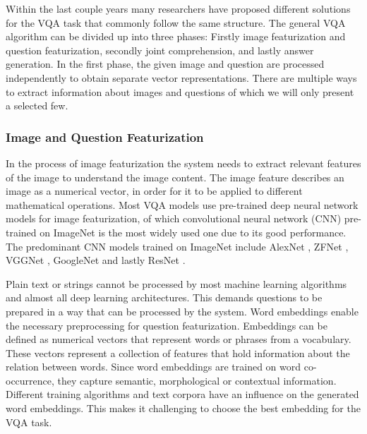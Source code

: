\documentclass{article}
\begin{document}
Within the last couple years many researchers have proposed different solutions for the VQA task that commonly follow the same structure. The general VQA algorithm can be divided up into three phases: Firstly image featurization and question featurization, secondly joint comprehension, and lastly answer generation.
In the first phase, the given image and question are processed independently to obtain separate vector representations. There are multiple ways to extract information about images and questions of which we will only present a selected few.

\subsubsection{Image and Question Featurization}

In the process of image featurization the system needs to extract relevant features of the image to understand the image content. The image feature describes an image as a numerical vector, in order for it to be applied to different mathematical operations. Most VQA models use pre-trained deep neural network models for image featurization, of which convolutional neural network (CNN) \citep{krizhevsky2012imagenet} pre-trained on ImageNet \citep{russakovsky2015imagenet} is the most widely used one due to its good performance. The predominant CNN models trained on ImageNet include AlexNet \citep{krizhevsky2012imagenet}, ZFNet \citep{zeiler2014visual}, VGGNet \citep{simonyan2015very}, GoogleNet \citep{szegedy2015going} and lastly ResNet \citep{residual}.

Plain text or strings cannot be processed by most machine learning algorithms and almost all deep learning architectures. This demands questions to be prepared in a way that can be processed by the system. Word embeddings enable the necessary preprocessing for question featurization. Embeddings can be defined as numerical vectors that represent words or phrases from a vocabulary. These vectors represent a collection of features that hold information about the relation between words. Since word embeddings are trained on word co-occurrence, they capture semantic, morphological or contextual information. Different training algorithms and text corpora have an influence on the generated word embeddings. This makes it challenging to choose the best embedding for the VQA task.
\end{document}
